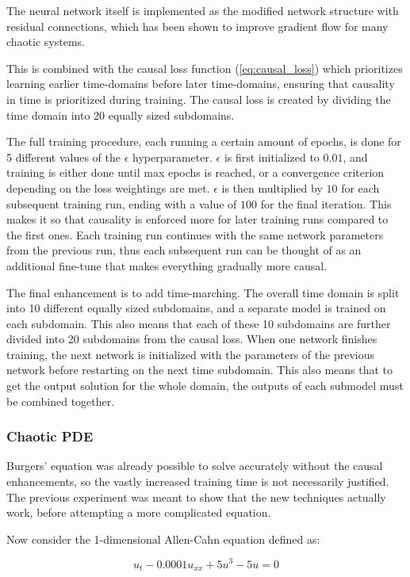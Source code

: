 The neural network itself is implemented as the modified network structure with residual connections, which has been shown to improve gradient flow for many chaotic systems.

This is combined with the causal loss function (\ref{eq:causal_loss}) which prioritizes learning earlier time-domains before later time-domains, ensuring that causality in time is prioritized during training. The causal loss is created by dividing the time domain into 20 equally sized subdomains.

The full training procedure, each running a certain amount of epochs, is done for 5 different values of the $\epsilon$ hyperparameter. $\epsilon$ is first initialized to $0.01$, and training is either done until max epochs is reached, or a convergence criterion depending on the loss weightings are met. $\epsilon$ is then multiplied by $10$ for each subsequent training run, ending with a value of $100$ for the final iteration. This makes it so that causality is enforced more for later training runs compared to the first ones. Each training run continues with the same network parameters from the previous run, thus each subsequent run can be thought of as an additional fine-tune that makes everything gradually more causal.

The final enhancement is to add time-marching. The overall time domain is split into 10 different equally sized subdomains, and a separate model is trained on each subdomain. This also means that each of these 10 subdomains are further divided into 20 subdomains from the causal loss. When one network finishes training, the next network is initialized with the parameters of the previous network before restarting on the next time subdomain. This also means that to get the output solution for the whole domain, the outputs of each submodel must be combined together.

\subsubsection{Chaotic PDE}

Burgers' equation was already possible to solve accurately without the causal enhancements, so the vastly increased training time is not necessarily justified. The previous experiment was meant to show that the new techniques actually work, before attempting a more complicated equation.

Now consider the 1-dimensional Allen-Cahn equation defined as:

\begin{equation}
    u_t - 0.0001u_{xx} + 5 u^3 - 5 u = 0
\end{equation}


